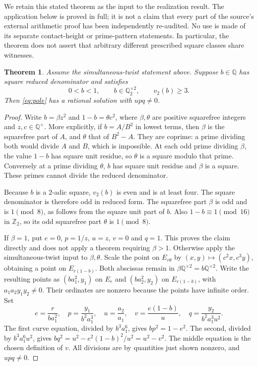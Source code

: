 \documentclass[10pt,a4paper]{article}
\newtheorem{theorem}{Theorem}[section]\newtheorem{lemma}[theorem]{Lemma}
\newcommand{\Q}{\mathbb Q}\newcommand{\Z}{\mathbb Z}
\begin{document}
We retain this stated theorem as the input to the realization result.
The application below is proved in full; it is not a claim that every
part of the source's external arithmetic proof has been independently
re-audited. No use is made of its separate contact-height or
prime-pattern statements. In particular, the theorem does not assert
that arbitrary different prescribed square classes share witnesses.

\begin{theorem}\label{thm:complete}
Assume the simultaneous-twist statement above. Suppose $b\in\Q$
has square reduced denominator and satisfies
\[
 0<b<1,\qquad b\in\Q_2^{\times2},\qquad v_2(b)\ge3.
\]
Then \eqref{eq:pole} has a rational solution with $upq\ne0$.
\end{theorem}
\begin{proof}
Write $b=\beta z^2$ and $1-b=\theta c^2$, where $\beta,\theta$
are positive squarefree integers and $z,c\in\Q^\times$. More
explicitly, if $b=A/B^2$ in lowest terms, then $\beta$ is the squarefree
part of $A$, and $\theta$ that of $B^2-A$. They are coprime: a prime
dividing both would divide $A$ and $B$, which is impossible.
At each odd prime dividing $\beta$, the value $1-b$ has square unit
residue, so $\theta$ is a square modulo that prime. Conversely at a
prime dividing $\theta$, $b$ has square unit residue and $\beta$ is a
square. These primes cannot divide the reduced denominator.

Because $b$ is a 2-adic square, $v_2(b)$ is even and is at least four.
The square denominator is therefore odd in reduced form. The squarefree
part $\beta$ is odd and is $1\pmod8$, as follows from the square unit
part of $b$. Also $1-b\equiv1\pmod {16}$ in $\Z_2$, so its odd
squarefree part $\theta$ is $1\pmod8$.

If $\beta=1$, put $e=0$, $p=1/z$, $u=z$, $v=0$ and $q=1$.
This proves the claim directly and does not apply a theorem requiring
$\beta>1$. Otherwise apply the simultaneous-twist input to
$\beta,\theta$. Scale the point on $E_{r\theta}$ by
$(x,y)\mapsto(c^2x,c^3y)$, obtaining a point on $E_{r(1-b)}$.
Both abscissas remain in $\beta\Q^{\times2}=b\Q^{\times2}$.
Write the resulting points as $(ba_1^2,y_1)$ on $E_r$ and
$(ba_2^2,y_2)$ on $E_{r(1-b)}$, with $a_1a_2y_1y_2\ne0$.
Their ordinates are nonzero because the points have infinite order.
Set
\[
 e=\frac{r}{ba_1^2},\quad p=\frac{y_1}{b^2a_1^3},\quad
 u=\frac{a_2}{a_1},\quad v=\frac{e(1-b)}u,\quad
 q=\frac{y_2}{b^2a_1^3u^2}.
\]
The first curve equation, divided by $b^3a_1^6$, gives
$bp^2=1-e^2$. The second, divided by $b^3a_1^6u^2$, gives
$bq^2=u^2-e^2(1-b)^2/u^2=u^2-v^2$. The middle equation is the
chosen definition of $v$. All divisions are by quantities just shown
nonzero, and $upq\ne0$.
\end{proof}
\end{document}
